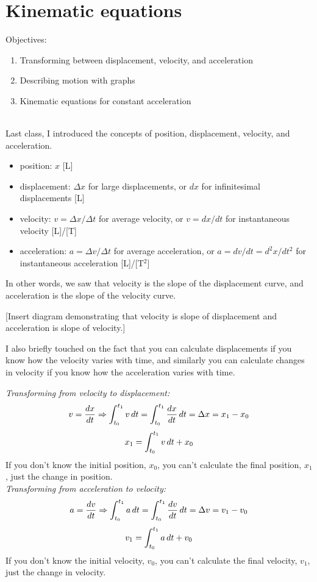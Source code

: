 \section{Kinematic equations}
Objectives:
\begin{enumerate}
\item Transforming between displacement, velocity, and acceleration
\item Describing motion with graphs
\item Kinematic equations for constant acceleration  
\end{enumerate}

\hrulefill\\

Last class, I introduced the concepts of position, displacement, velocity, and acceleration.
\begin{itemize}
\item position: $x$ [L]
\item displacement: $\Delta{x}$ for large displacements, or $dx$ for infinitesimal displacements [L]
\item velocity: $v=\Delta{x}/\Delta{t}$ for average velocity, or $v=dx/dt$ for instantaneous velocity [L]/[T]
\item acceleration: $a=\Delta{v}/\Delta{t}$ for average acceleration, or $a=dv/dt=d^2x/dt^2$ for instantaneous acceleration [L]/[T$^2$]
\end{itemize}

In other words, we saw that velocity is the slope of the displacement curve, and acceleration is the slope of the velocity curve. 

[Insert diagram demonstrating that velocity is slope of displacement and acceleration is slope of velocity.]
\vspace{5cm}


I also briefly touched on the fact that you can calculate displacements if you know how the velocity varies with time, and similarly you can calculate changes in velocity if you know how the acceleration varies with time.

\textit{Transforming from velocity to displacement:}\\
$$\displaystyle v=\frac{dx}{dt}\Rightarrow \int_{t_0}^{t_1}v\,dt=\int_{t_0}^{t_1}\frac{dx}{dt}\,dt=\Delta{x}=x_1-x_0$$
$$\displaystyle x_1=\int_{t_0}^{t_1}v\,dt+x_0$$
If you don't know the initial position, $x_0$, you can't calculate the final position, $x_1$, just the change in position.\\

\textit{Transforming from acceleration to velocity:}\\
$$\displaystyle a=\frac{dv}{dt}\Rightarrow \int_{t_0}^{t_1}a\,dt=\int_{t_0}^{t_1}\frac{dv}{dt}\,dt=\Delta{v}=v_1-v_0$$
$$\displaystyle v_1= \int_{t_0}^{t_1}a\,dt+v_0$$
If you don't know the initial velocity, $v_0$, you can't calculate the final velocity, $v_1$, just the change in velocity.

